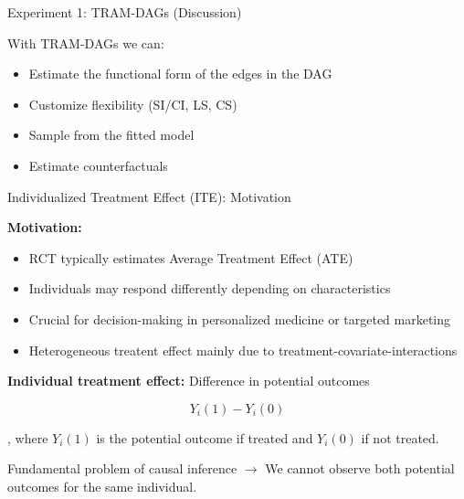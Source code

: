 \documentclass[onlytextwidth,english]{beamer}\usepackage[]{graphicx}\usepackage[]{xcolor}
\begin{document}
\begin{frame}{Experiment 1: TRAM-DAGs (Discussion)}


With TRAM-DAGs we can:

\begin{itemize}
    \item Estimate the functional form of the edges in the DAG
    \item Customize flexibility (SI/CI, LS, CS)
    \item Sample from the fitted model
    \item Estimate counterfactuals
\end{itemize}
\end{frame}








\begin{frame}{Individualized Treatment Effect (ITE): Motivation}


\textbf{Motivation:}

\begin{itemize}
    \item RCT typically estimates Average Treatment Effect (ATE)
    \item Individuals may respond differently depending on characteristics
    \item Crucial for decision-making in personalized medicine or targeted marketing
    \item Heterogeneous treatent effect mainly due to treatment-covariate-interactions
\end{itemize}
    
\textbf{Individual treatment effect:} Difference in potential outcomes

\[
Y_i(1) - Y_i(0)
\]

, where $Y_i(1)$ is the potential outcome if treated and $Y_i(0)$ if not treated.


Fundamental problem of causal inference $\rightarrow$ We cannot observe both potential outcomes for the same individual.

\end{frame}
\end{document}
